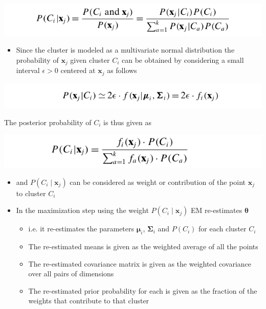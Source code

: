 \documentclass[11pt]{article}
\begin{document}
\begin{center}
\includegraphics[width=.9\linewidth]{Representative-based Clustering/screenshot_2018-11-27_20-03-11.png}
\end{center}
\begin{itemize}
\item Since the cluster is modeled as a multivariate normal distribution the probability of \(\pmb x_j\) given cluster \(C_i\) can be obtained by considering a small interval \(\epsilon > 0\)  centered at \(\pmb x_j\) as follows
\end{itemize}
\begin{center}
\includegraphics[width=.9\linewidth]{Representative-based Clustering/screenshot_2018-11-27_20-05-54.png}
\end{center}
The posterior probability of \(C_i\) is thus given as 
\begin{center}
\includegraphics[width=.9\linewidth]{Representative-based Clustering/screenshot_2018-11-27_20-07-19.png}
\end{center}
\begin{itemize}
\item and \(P(C_i \mid \pmb x_j)\) can be considered as weight or contribution of the point \(\pmb x_j\) to cluster \(C_i\)

\item In the maximization step using the weight \(P(C_i \mid \pmb x_j)\) EM re-estimates \(\pmb \theta\)
\begin{itemize}
\item i.e. it re-estimates the parameters \(\pmb \mu_i\), \(\mathbf \Sigma_i\) and \(P(C_i)\) for each cluster \(C_i\)
\item The re-estimated means is given as the weighted average of all the points
\item The re-estimated covariance matrix is given as the weighted covariance over all pairs of dimensions
\item The re-estimated prior probability for each is given as the fraction of the weights that contribute to that cluster
\end{itemize}
\end{itemize}
\end{document}
